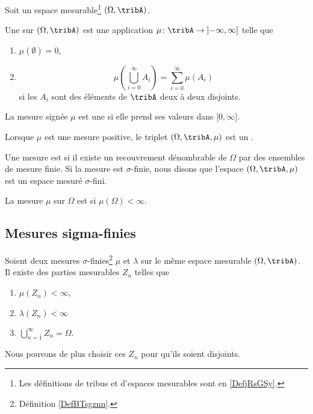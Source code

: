 \begin{definition}  \label{DefBTsgznn}
	Soit un espace mesurable\footnote{Les définitions de tribus et d'espaces mesurables sont en \ref{DefjRsGSy}.} \( (\Omega,\tribA)\).

	Une  sur \( (\Omega,\tribA)\) est une application \(\mu \colon \tribA\to \mathopen] -\infty,\infty\mathclose]  \) telle que
	\begin{enumerate}
		\item
		      \( \mu(\emptyset)=0\),
		\item       \label{ItemQFjtOjXiii}
		      \begin{equation}		\label{EQooKJHQooHIQyUj}
			      \mu\left( \bigcup_{i=0}^{\infty}A_i\right)=\sum_{i=0}^{\infty}\mu(A_i)
		      \end{equation}
		      si les \( A_i\) sont des éléments de \( \tribA\) deux à deux disjoints.
	\end{enumerate}

	La mesure signée \( \mu\) est une   si elle prend ses valeurs dans \( \mathopen[ 0,\infty\mathclose]\).

	Lorsque \( \mu\) est une mesure positive, le triplet \( (\Omega,\tribA,\mu)\) est un .

	Une mesure est  si il existe un recouvrement dénombrable de \( \Omega\) par des ensembles de mesure finie. Si la mesure est \( \sigma\)-finie, nous disons que l'espace \( (\Omega,\tribA,\mu)\) est un espace mesuré \( \sigma\)-fini.

	La mesure \( \mu\) sur \( \Omega\) est  si \( \mu(\Omega)<\infty\).
\end{definition}

\subsection{Mesures sigma-finies}

\begin{lemma}		\label{LEMooXOPMooMmIbmD}
	Soient deux mesures \( \sigma\)-finies\footnote{Définition \ref{DefBTsgznn}.} \( \mu\) et \( \lambda\) sur le même espace mesurable \( (\Omega,\tribA)\). Il existe des parties mesurables \( Z_n\) telles que
	\begin{enumerate}
		\item
		      \( \mu(Z_n)<\infty\),
		\item
		      \( \lambda(Z_n)<\infty\)
		\item
		      \( \bigcup_{n=1}^{\infty}Z_n=\Omega\).
	\end{enumerate}
	Nous pouvons de plus choisir ces \( Z_n\) pour qu'ils soient disjoints.
\end{lemma}

